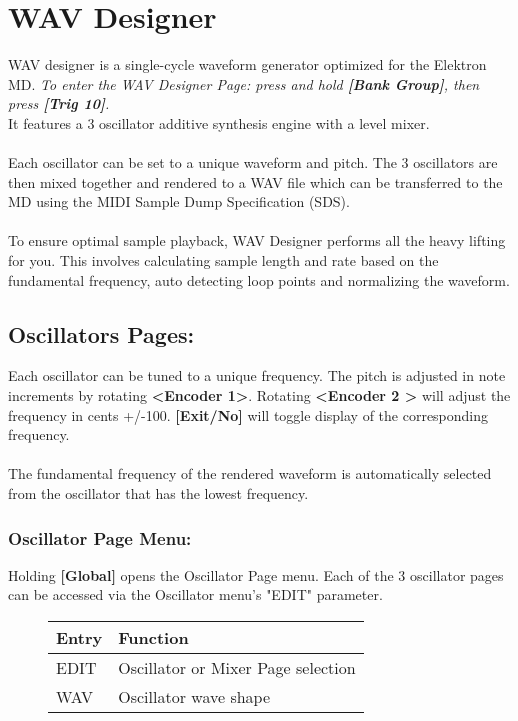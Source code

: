 \chapter{WAV Designer}
WAV designer is a single-cycle waveform generator optimized for the Elektron MD. \textit{To enter the WAV Designer Page: press and hold \textbf{[Bank Group]}, then press \textbf{[Trig 10]}.}\\
It features a 3 oscillator additive synthesis engine with a level mixer.\\
\\
Each oscillator can be set to a unique waveform and pitch. The 3 oscillators are then mixed together and rendered to a WAV file which can be transferred to the MD using the MIDI Sample Dump Specification (SDS).\\
\\
To ensure optimal sample playback, WAV Designer performs all the heavy lifting for you. This involves calculating sample length and rate based on the fundamental frequency, auto detecting loop points and normalizing the waveform.
\section{Oscillators Pages:}
Each oscillator can be tuned to a unique frequency. The pitch is adjusted in note increments by rotating \textbf{<Encoder 1>}. Rotating \textbf{<Encoder 2 >} will adjust the frequency in cents +/-100. \textbf{[Exit/No]} will toggle display of the corresponding frequency.\\
\\The fundamental frequency of the rendered waveform is automatically selected from the oscillator that has the lowest frequency.\\

\newpage
\subsection{Oscillator Page Menu:}
Holding \textbf{[Global]} opens the Oscillator Page menu.
Each of the 3 oscillator pages can be accessed via the Oscillator menu's "EDIT" parameter.
\begin{figure}[hb]
    \begin{tabular}{|l|l|}
    \hline
    \rowcolor[HTML]{C0C0C0}
    Entry     & Function \\ \hline
    EDIT      & Oscillator or Mixer Page selection \\ \hline
    WAV       & Oscillator wave shape\\ \hline
    \end{tabular}
\end{figure}
\newpage


